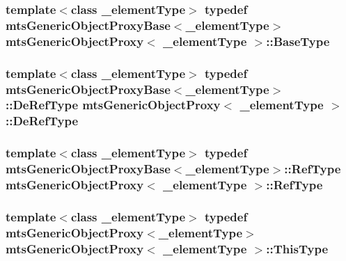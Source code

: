 \subsubsection[{Base\+Type}]{\setlength{\rightskip}{0pt plus 5cm}template$<$class \+\_\+element\+Type$>$ typedef {\bf mts\+Generic\+Object\+Proxy\+Base}$<$\+\_\+element\+Type$>$ {\bf mts\+Generic\+Object\+Proxy}$<$ \+\_\+element\+Type $>$\+::{\bf Base\+Type}}\label{classmts_generic_object_proxy_a8635f88c647c718cee6f7760529c27a5}
\hypertarget{classmts_generic_object_proxy_a5bab9bef15f9fef5e51f0060cf50e8d5}{}
\subsubsection[{De\+Ref\+Type}]{\setlength{\rightskip}{0pt plus 5cm}template$<$class \+\_\+element\+Type$>$ typedef {\bf mts\+Generic\+Object\+Proxy\+Base}$<$\+\_\+element\+Type$>$\+::{\bf De\+Ref\+Type} {\bf mts\+Generic\+Object\+Proxy}$<$ \+\_\+element\+Type $>$\+::{\bf De\+Ref\+Type}}\label{classmts_generic_object_proxy_a5bab9bef15f9fef5e51f0060cf50e8d5}
\hypertarget{classmts_generic_object_proxy_aa1632a227bbb41bbfaeb4b2ccd90ed6a}{}
\subsubsection[{Ref\+Type}]{\setlength{\rightskip}{0pt plus 5cm}template$<$class \+\_\+element\+Type$>$ typedef {\bf mts\+Generic\+Object\+Proxy\+Base}$<$\+\_\+element\+Type$>$\+::{\bf Ref\+Type} {\bf mts\+Generic\+Object\+Proxy}$<$ \+\_\+element\+Type $>$\+::{\bf Ref\+Type}}\label{classmts_generic_object_proxy_aa1632a227bbb41bbfaeb4b2ccd90ed6a}
\hypertarget{classmts_generic_object_proxy_a03ddcddca7f7515d81de5a0031d175a2}{}
\subsubsection[{This\+Type}]{\setlength{\rightskip}{0pt plus 5cm}template$<$class \+\_\+element\+Type$>$ typedef {\bf mts\+Generic\+Object\+Proxy}$<$\+\_\+element\+Type$>$ {\bf mts\+Generic\+Object\+Proxy}$<$ \+\_\+element\+Type $>$\+::{\bf This\+Type}}\label{classmts_generic_object_proxy_a03ddcddca7f7515d81de5a0031d175a2}
\hypertarget{classmts_generic_object_proxy_a4c47d4b184e02d7443de1face033af34}{}

